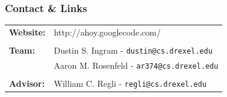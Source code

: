 \documentclass[mathserif,usenames,dvipsnames]{beamer}
\begin{document}
\frame
{
    \frametitle{Contact \& Links}
    \begin{tabular}{l l}
        \textbf{Website:} & http://ahoy.googlecode.com/ \\
        & \\
        \textbf{Team:} & Dustin S. Ingram - \texttt{dustin@cs.drexel.edu} \\
        & Aaron M. Rosenfeld - \texttt{ar374@cs.drexel.edu} \\
        & \\
        \textbf{Advisor:} & William C. Regli - \texttt{regli@cs.drexel.edu} \\
    \end{tabular}
    \vspace{0.75cm}
    \begin{center}
    \begin{tabular}{c c c c}

\end{tabular}
\end{center}}
\end{document}
